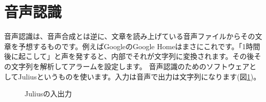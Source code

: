 \section{音声認識}
音声認識は、音声合成とは逆に、文章を読み上げている音声ファイルからその文章を予想するものです。例えばGoogleのGoogle Homeはまさにこれです。「1時間後に起こして」と声を発すると、内部でそれが文字列に変換されます。その後その文字列を解析してアラームを設定します。
音声認識のためのソフトウェアとしてJuliusというものを使います。入力は音声で出力は文字列になります(図\ref{Juliusの入出力})。

\begin{figure}[H]
\begin{center}
    
    \caption{Juliusの入出力}
    \label{Juliusの入出力}
\end{center}
\end{figure}

\begin{tcolorbox}[title=\useOmetoi]
\begin{enumerate}
\end{enumerate}
\end{tcolorbox}
